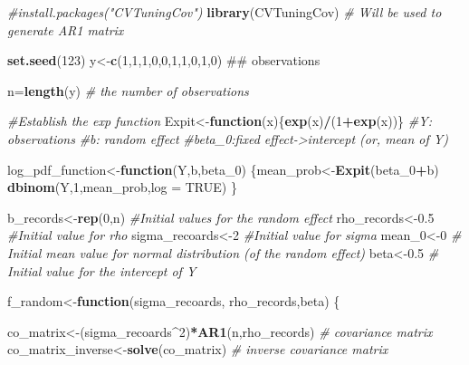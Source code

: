 \documentclass[]{book}
\newenvironment{Shaded}{\begin{snugshade}}{\end{snugshade}}
\newcommand{\KeywordTok}[1]{\textcolor[rgb]{0.13,0.29,0.53}{\textbf{#1}}}
\newcommand{\DataTypeTok}[1]{\textcolor[rgb]{0.13,0.29,0.53}{#1}}
\newcommand{\DecValTok}[1]{\textcolor[rgb]{0.00,0.00,0.81}{#1}}
\newcommand{\FloatTok}[1]{\textcolor[rgb]{0.00,0.00,0.81}{#1}}
\newcommand{\CommentTok}[1]{\textcolor[rgb]{0.56,0.35,0.01}{\textit{#1}}}
\newcommand{\OtherTok}[1]{\textcolor[rgb]{0.56,0.35,0.01}{#1}}
\newcommand{\ControlFlowTok}[1]{\textcolor[rgb]{0.13,0.29,0.53}{\textbf{#1}}}
\newcommand{\OperatorTok}[1]{\textcolor[rgb]{0.81,0.36,0.00}{\textbf{#1}}}
\newcommand{\NormalTok}[1]{#1}
\begin{document}
\begin{Shaded}
\begin{Highlighting}[]
\CommentTok{#install.packages("CVTuningCov")}
\KeywordTok{library}\NormalTok{(CVTuningCov) }\CommentTok{# Will be used to generate AR1 matrix}

\KeywordTok{set.seed}\NormalTok{(}\DecValTok{123}\NormalTok{)}
\NormalTok{y<-}\KeywordTok{c}\NormalTok{(}\DecValTok{1}\NormalTok{,}\DecValTok{1}\NormalTok{,}\DecValTok{1}\NormalTok{,}\DecValTok{0}\NormalTok{,}\DecValTok{0}\NormalTok{,}\DecValTok{1}\NormalTok{,}\DecValTok{1}\NormalTok{,}\DecValTok{0}\NormalTok{,}\DecValTok{1}\NormalTok{,}\DecValTok{0}\NormalTok{) ## observations}

\NormalTok{n=}\KeywordTok{length}\NormalTok{(y) }\CommentTok{# the number of observations}


\CommentTok{#Establish the exp function}
\NormalTok{Expit<-}\ControlFlowTok{function}\NormalTok{(x)\{}\KeywordTok{exp}\NormalTok{(x)}\OperatorTok{/}\NormalTok{(}\DecValTok{1}\OperatorTok{+}\KeywordTok{exp}\NormalTok{(x))\}}
\CommentTok{#Y: observations}
\CommentTok{#b: random effect}
\CommentTok{#beta_0:fixed effect->intercept (or, mean of Y)}

\NormalTok{log_pdf_function<-}\ControlFlowTok{function}\NormalTok{(Y,b,beta_}\DecValTok{0}\NormalTok{)}
\NormalTok{  \{mean_prob<-}\KeywordTok{Expit}\NormalTok{(beta_}\DecValTok{0}\OperatorTok{+}\NormalTok{b)}
  \KeywordTok{dbinom}\NormalTok{(Y,}\DecValTok{1}\NormalTok{,mean_prob,}\DataTypeTok{log =} \OtherTok{TRUE}\NormalTok{)}
\NormalTok{  \}}

\NormalTok{b_records<-}\KeywordTok{rep}\NormalTok{(}\DecValTok{0}\NormalTok{,n)  }\CommentTok{#Initial values for the random effect}
\NormalTok{rho_records<-}\FloatTok{0.5} \CommentTok{#Initial value for rho}
\NormalTok{sigma_recoards<-}\DecValTok{2}  \CommentTok{#Initial value for sigma}
\NormalTok{mean_}\DecValTok{0}\NormalTok{<-}\DecValTok{0} \CommentTok{# Initial mean value for normal distribution (of the random effect)}
\NormalTok{beta<-}\FloatTok{0.5} \CommentTok{# Initial value for the intercept of Y}


\NormalTok{f_random<-}\ControlFlowTok{function}\NormalTok{(sigma_recoards, rho_records,beta)}
\NormalTok{\{}
  
\NormalTok{co_matrix<-(sigma_recoards}\OperatorTok{^}\DecValTok{2}\NormalTok{)}\OperatorTok{*}\KeywordTok{AR1}\NormalTok{(n,rho_records) }\CommentTok{# covariance matrix}
\NormalTok{co_matrix_inverse<-}\KeywordTok{solve}\NormalTok{(co_matrix)  }\CommentTok{# inverse covariance matrix}



\end{Highlighting}
\end{Shaded}
\end{document}

